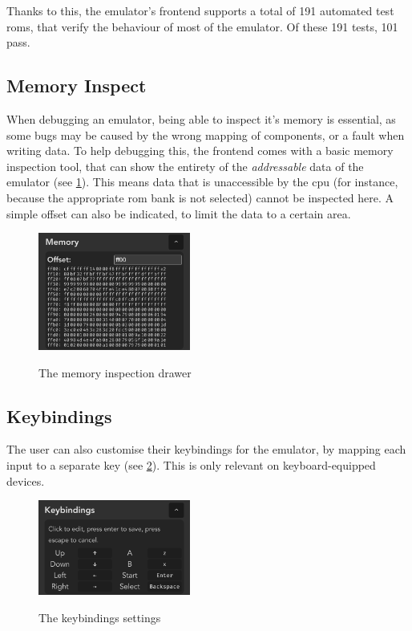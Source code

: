\documentclass[11pt]{informatics-report}
\begin{document}
Thanks to this, the emulator's frontend supports a total of 191 automated test \glspl{rom}, that verify the behaviour of most of the emulator. Of these 191 tests, 101 pass.

\subsection{Memory Inspect}

When debugging an emulator, being able to inspect it's memory is essential, as some bugs may be caused by the wrong mapping of components, or a fault when writing data. To help debugging this, the frontend comes with a basic memory inspection tool, that can show the entirety of the \textit{addressable} data of the emulator (see \ref{fig:memory-inspect}). This means data that is unaccessible by the \gls{cpu} (for instance, because the appropriate \gls{rom} bank is not selected) cannot be inspected here. A simple offset can also be indicated, to limit the data to a certain area.

\begin{figure}[h]
    \centering
    \includegraphics[width=5cm]{images/memory-inspect}\\
    \caption{The memory inspection drawer}
    \label{fig:memory-inspect}
\end{figure}

\subsection{Keybindings}

The user can also customise their keybindings for the emulator, by mapping each input to a separate key (see \ref{fig:keybindings}). This is only relevant on keyboard-equipped devices.

\begin{figure}[h]
    \centering
    \includegraphics[width=5cm]{images/keybindings}\\
    \caption{The keybindings settings}
    \label{fig:keybindings}
\end{figure}
\end{document}
